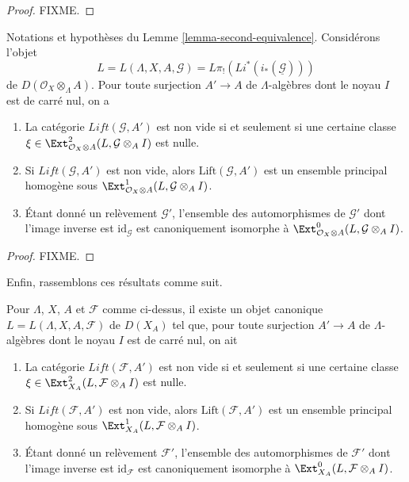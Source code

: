\begin{proof}
FIXME.
\end{proof}

\begin{lemma}
\label{lemma-second-equivalence-obs}
Notations et hypoth\`eses du Lemme \ref{lemma-second-equivalence}.
Consid\'erons l'objet
$$
L = L(\Lambda, X, A, \mathcal{G}) = L\pi_!(Li^*(i_*(\underline{\mathcal{G}})))
$$
de $D(\mathcal{O}_X \otimes_\Lambda A)$. Pour toute surjection $A' \to A$
de $\Lambda$-alg\`ebres dont le noyau $I$ est de carr\'e nul, on a
\begin{enumerate}
\item La cat\'egorie $\textit{Lift}(\mathcal{G}, A')$ est non vide si et
seulement si une certaine classe
$\xi \in \Ext^2_{\mathcal{O}_X \otimes A}(L, \mathcal{G} \otimes_A I)$
est nulle.
\item Si $\textit{Lift}(\mathcal{G}, A')$ est non vide, alors
$\text{Lift}(\mathcal{G}, A')$ est un ensemble principal homog\`ene sous
$\Ext^1_{\mathcal{O}_X \otimes A}(L, \mathcal{G} \otimes_A I)$.
\item \'Etant donn\'e un rel\`evement $\mathcal{G}'$, l'ensemble des
automorphismes de $\mathcal{G}'$ dont l'image inverse est
$\text{id}_\mathcal{G}$ est
canoniquement isomorphe \`a
$\Ext^0_{\mathcal{O}_X \otimes A}(L, \mathcal{G} \otimes_A I)$.
\end{enumerate}
\end{lemma}

\begin{proof}
FIXME.
\end{proof}

\noindent
Enfin, rassemblons ces r\'esultats comme suit.

\begin{proposition}
\label{proposition-conclusion}
Pour $\Lambda$, $X$, $A$ et $\mathcal{F}$ comme ci-dessus, il existe un objet
canonique $L = L(\Lambda, X, A, \mathcal{F})$ de $D(X_A)$ tel que, pour toute
surjection $A' \to A$ de $\Lambda$-alg\`ebres dont le noyau $I$ est de carr\'e
nul, on ait
\begin{enumerate}
\item La cat\'egorie $\textit{Lift}(\mathcal{F}, A')$ est non vide si et
seulement si une certaine classe $\xi \in \Ext^2_{X_A}(L,
\mathcal{F} \otimes_A I)$ est nulle.
\item Si $\textit{Lift}(\mathcal{F}, A')$ est non vide, alors
$\text{Lift}(\mathcal{F}, A')$ est un ensemble principal homog\`ene sous
$\Ext^1_{X_A}(L, \mathcal{F} \otimes_A I)$.
\item \'Etant donn\'e un rel\`evement $\mathcal{F}'$, l'ensemble des
automorphismes de $\mathcal{F}'$ dont l'image inverse est
$\text{id}_\mathcal{F}$ est
canoniquement isomorphe \`a
$\Ext^0_{X_A}(L, \mathcal{F} \otimes_A I)$.
\end{enumerate}
\end{proposition}

